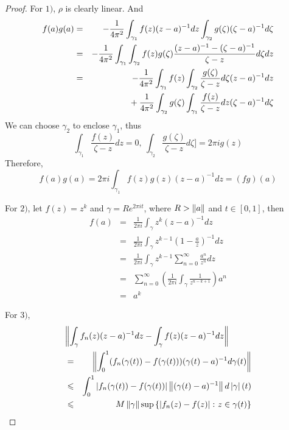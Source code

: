 \documentclass[a4paper,11pt]{report}
\begin{document}
\begin{proof}
	For $1)$, $\rho$ is clearly linear. And
		\begin{eqnarray*}
			f(a)g(a)&=& -\frac{1}{4 \pi^{2}}\int_{\gamma_1} f(z) (z-a)^{-1} dz\int_{\gamma_2} g(\zeta) (\zeta-a)^{-1} d\zeta \\
			&=& -\frac{1}{4 \pi^{2}}\int_{\gamma_1}\int_{\gamma_2} f(z)g(\zeta) \frac{(z-a)^{-1}-(\zeta-a)^{-1}}{\zeta-z} d\zeta dz \\
			&=& -\frac{1}{4 \pi^{2}}\int_{\gamma_1}f(z) \int_{\gamma_2} \frac{g(\zeta)}{\zeta-z} d\zeta (z-a)^{-1} dz \\
		    && \negmedspace{} + \frac{1}{4 \pi^{2}}\int_{\gamma_2}g(\zeta) \int_{\gamma_1} \frac{f(z)}{\zeta-z} dz (\zeta-a)^{-1} d\zeta
		\end{eqnarray*}
		We can choose $\gamma_2$ to enclose $\gamma_1$, thus 
		\begin{equation*}
			\int_{\gamma_1} \frac{f(z)}{\zeta-z} dz =0,~ \int_{\gamma_2} \frac{g(\zeta)}{\zeta-z} d\zeta] = 2\pi i g(z)
		\end{equation*}
		Therefore, 
		\begin{equation*}
			f(a)g(a) = {2 \pi i}\int_{\gamma_1} f(z)g(z)(z-a)^{-1} dz = (fg)(a)
		\end{equation*}
	\item For $2)$, let $f(z) = z^k$ and $\gamma = R e^{2 \pi i t}$, where $R>\left\lVert a\right\lVert$ and $t \in [0,1]$, then
	\begin{eqnarray*}
		f(a) &=& \frac{1}{2 \pi i}\int_{\gamma} z^k (z-a)^{-1} dz \\
		&=& \frac{1}{2 \pi i}\int_{\gamma} z^{k-1} (1-\frac{a}{z})^{-1} dz \\
		&=& \frac{1}{2 \pi i}\int_{\gamma} z^{k-1} \sum_{n=0}^{\infty} \frac{a^{n}}{z^{n}}dz \\
		&=& \sum_{n=0}^{\infty} (\frac{1}{2 \pi i}\int_{\gamma} \frac{1}{z^{n-k+1}}) a^{n} \\
		&=& a^{k}
	\end{eqnarray*}
	\item For $3)$, 
	\begin{eqnarray*}
		\lefteqn { \norm{\int_{\gamma} f_n(z) (z-a)^{-1} dz - \int_{\gamma} f(z) (z-a)^{-1} dz} }\\
		&=& \norm{\int_{0}^{1}(f_n(\gamma(t))-f(\gamma(t)))(\gamma(t)-a)^{-1}d\gamma(t)}\\
		&\leqslant& \int_{0}^{1} \abs{f_n(\gamma(t))-f(\gamma(t))}\norm{(\gamma(t)-a)^{-1}}d\abs{\gamma}(t) \\
		&\leqslant& M \norm{\gamma} \sup{\{\abs{f_n(z)-f(z)} \colon z \in \gamma(t)\}}

\end{eqnarray*}
\end{proof}
\end{document}
